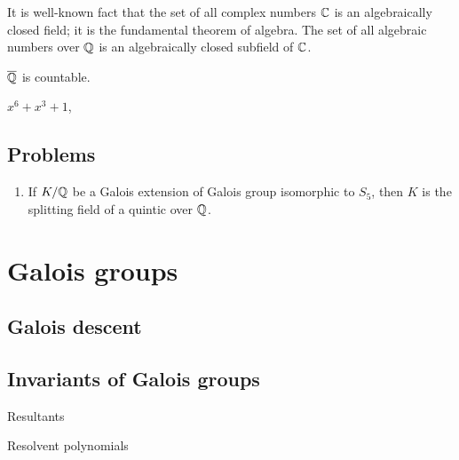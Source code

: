 \documentclass{../../large}
\begin{document}
\begin{prb}
It is well-known fact that the set of all complex numbers $\mathbb{C}$ is an algebraically closed field; it is the fundamental theorem of algebra.
The set of all algebraic numbers over $\mathbb{Q}$ is an algebraically closed subfield of $\mathbb{C}$.
\begin{parts}
\item $\overline{\mathbb{Q}}$ is countable.
\end{parts}
\end{prb}


$x^6+x^3+1$,


\section*{Problems}

\begin{enumerate}
\item If $K/\mathbb{Q}$ be a Galois extension of Galois group isomorphic to $S_5$, then $K$ is the splitting field of a quintic over $\mathbb{Q}$.
\end{enumerate}








\chapter{Galois groups}


\section{Galois descent}




\section{Invariants of Galois groups}

Resultants

Resolvent polynomials

\begin{prb}
\end{prb}
\begin{prb}
\end{prb}
\begin{prb}
\end{prb}
\begin{prb}
\end{prb}
\begin{prb}
\end{prb}
\end{document}
